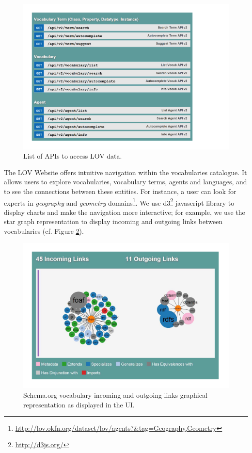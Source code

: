 \documentclass{iosart2c}
\begin{document}
\begin{figure}[!htb]
\includegraphics[trim={1cm 1cm 1cm 2cm},width=1.2\textwidth]{apis.pdf}
\caption{List of APIs to access LOV data.}
\label{fig:apis}
\end{figure}

The LOV Website offers intuitive navigation within the vocabularies catalogue. It allows users to explore vocabularies, vocabulary terms, agents and languages, and to see the connections between these entities. For instance, a user can look for experts in \emph{geography} and \emph{geometry} domains\footnote{\url{http://lov.okfn.org/dataset/lov/agents?&tag=Geography,Geometry}}. We use d3\footnote{\url{http://d3js.org/}} javascript library to display charts and make the navigation more interactive; for example, we use the star graph representation to display incoming and outgoing links between vocabularies (cf. Figure \ref{fig:graphVocab}). 


\begin{figure}[ht!b]
\includegraphics[trim={1cm 1cm 1cm 1cm},width=1\textwidth]{graphVocab.pdf}
\caption{Schema.org vocabulary incoming and outgoing links graphical representation as displayed in the UI.}
\label{fig:graphVocab}
\end{figure}
\end{document}
